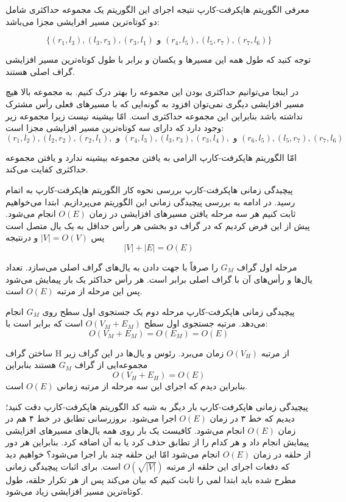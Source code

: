 \begin{itemframe}{‌معرفی الگوریتم هاپکرفت-کارپ}
\itm
نتیجه اجرای این الگوریتم یک مجموعه حداکثری شامل دو کوتاه‌ترین مسیر‌ افرایشی مجزا می‌باشد:

$$
\{(r_1, l_3), (l_3, r_3), (r_3, l_1) \text{ و } (r_4, l_5), (l_5, r_7), (r_7, l_6) \}
$$

توجه کنید که طول همه این مسیر‌ها و یکسان و برابر با طول کوتاه‌ترین مسیر افزایشی گراف اصلی هستند.

\itm
در اینجا می‌توانیم حداکثری بودن این مجموعه را بهتر درک کنیم. به مجموعه بالا هیچ مسیر افزایشی دیگری نمی‌توان افزود به گونه‌ایی که با مسیرهای فعلی رأس مشترک نداشته باشد بنابراین این مجموعه حداکثری است. امّا بیشینه نیست زیرا مجموعه زیر وجود دارد که دارای سه کوتاه‌ترین مسیر افزایشی مجزا است:
$$
(r_1, l_2) ,(l_2, r_2), (r_2, l_1), \text{ و } (r_4, l_3), (l_3, r_3), (r_3, l_4), \text{ و } (r_6, l_5),  (l_5, r_7),  (r_7, l_6)
$$

\itm
امّا الگوریتم هاپکرفت-کارپ الزامی به یافتن مجموعه بیشینه ندارد و یافتن مجموعه حداکثری کفایت می‌کند.

\end{itemframe}


\begin{itemframe}{‌پیچیدگی زمانی هاپکرفت-کارپ}
\itm
بررسی نحوه کار الگوریتم هاپکرفت-کارپ به اتمام رسید. در ادامه به بررسی پیچیدگی زمانی این الگوریتم می‌پردازیم.
\itm
ابتدا می‌خواهیم ثابت کنیم هر سه مرحله یافتن مسیرهای افزایشی در زمان $O(E)$ انجام می‌شود. پیش از این فرض کردیم که در گراف دو بخشی هر رأس حداقل به یک یال متصل است پس
$|V| = O(V)$
و درنتیجه
$$|V| + |E| = O(E)$$

\itm
مرحله اول گراف
$G_M$
را صرفاً با جهت دادن به یال‌های گراف اصلی می‌سازد. تعداد یال‌ها و رأس‌های آن با گراف اصلی برابر است. هر رأس حداکثر یک بار پیمایش می‌شود پس این مرحله از مرتبه $O(E)$ است.
\end{itemframe}


\begin{itemframe}{‌پیچیدگی زمانی هاپکرفت-کارپ}
\itm
مرحله دوم یک جستجوی اول سطح روی
$G_M$
انجام می‌دهد. مرتبه جستجوی اول سطح
$O(V_M+E_M)$
است که برابر است با:
$$O(V_M+E_M) = O(E_M) = O(E)$$

\itm
ساختن گراف H از مرتبه
$O(V_H)$
زمان می‌برد. رئوس و یال‌ها در این گراف زیر مجموعه‌ایی از گراف $G_M$ هستند بنابراین
$$O(V_H+E_H) = O(E)$$
\itm
بنابراین دیدم که اجرای این سه مرحله از مرتبه زمانی
$O(E)$
است.
\end{itemframe}


\begin{itemframe}{‌پیچیدگی زمانی هاپکرفت-کارپ}
\itm
بار دیگر به شبه کد الگوریتم هاپکرفت-کارپ دقت کنید؛ دیدیم که خط ۳ در زمان $O(E)$ اجرا می‌شود. بروزرسانی تطابق در خط ۴ هم در  زمان $O(E)$ انجام می‌شود. کافیست یک بار روی همه یال‌های مسیرهای افزایشی پیمایش انجام داد و هر کدام را از تطابق حذف کرد یا به آن اضافه کرد.
\itm
بنابراین هر دور از حلقه در زمان $O(E)$ انجام می‌شود امّا این حلقه چند بار اجرا می‌شود؟ خواهیم دید که دفعات اجرای این حلقه از مرتبه
$O(\sqrt{|V|})$
است.
\itm
برای اثبات پیچیدگی زمانی مطرح شده باید ابتدا لمی را ثابت کنیم که بیان می‌کند پس از هر تکرار حلقه، طول کوتاه‌ترین مسیر افزایشی زیاد می‌شود.
\end{itemframe}


